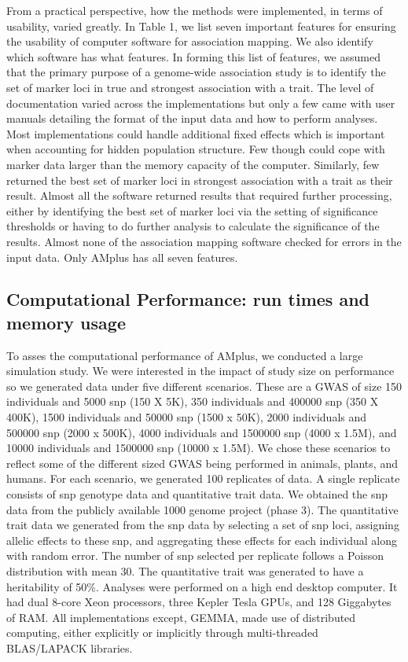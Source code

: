 \documentclass[12pt]{article}
\begin{document}
From a practical perspective, how the methods were implemented, in terms of usability, varied greatly. In Table 1, we list seven important features for ensuring the usability of computer software for association mapping. We also identify which software has what features. 
In forming this list of features, we assumed that the primary purpose of a genome-wide association study is 
to identify the set of marker loci in true and strongest association with a trait.  The level of documentation varied across the implementations but only 
a few came with user manuals detailing the format of the input data and how to perform analyses. 
Most implementations could handle additional fixed effects which is important when accounting for hidden population structure. 
Few though could cope with marker data larger than the memory capacity of the computer. Similarly, few returned the best set of marker loci in strongest association with a trait as their result. Almost all the software returned results that required further processing, either 
by identifying the best set of marker loci via the setting of significance thresholds or having to do further analysis to calculate the significance of the results. Almost none of the association mapping software checked for errors in the input data.  Only AMplus has all seven features. 


\subsection{Computational Performance: run times and memory usage}


To asses the computational performance of AMplus, we conducted a large simulation study. 
We were interested in  the impact of study size on  performance so we generated data under five different scenarios. 
These are a GWAS of size 150 individuals and 5000 snp (150 X 5K), 350 individuals and 400000 snp (350 X 400K),  1500 individuals and 
50000 snp (1500 x 50K), 2000 individuals and 500000 snp (2000 x 500K), 4000 individuals and 
1500000 snp (4000 x 1.5M), and 10000 individuals and 1500000 snp (10000 x 1.5M).  
We chose these scenarios to reflect some of the different sized GWAS being performed in animals, plants, and humans. 
For each scenario, we generated 100 replicates of data. A single replicate consists of snp genotype data and quantitative trait data. 
We obtained the snp data from the publicly available 1000 genome project (phase 3). The quantitative trait data we generated from the 
snp data by selecting a set of snp loci, assigning allelic effects to these snp, and aggregating these effects for each individual along with 
random error. The number of snp selected per replicate follows a Poisson distribution with mean 30.
 The quantitative trait was generated to have a heritability of 50\%.
Analyses were performed on a high end desktop computer. It had dual 8-core Xeon processors, three Kepler Tesla GPUs, and 128 Giggabytes of RAM. All implementations except, GEMMA, made use of distributed computing, either explicitly or implicitly through multi-threaded BLAS/LAPACK libraries. 
\end{document}
